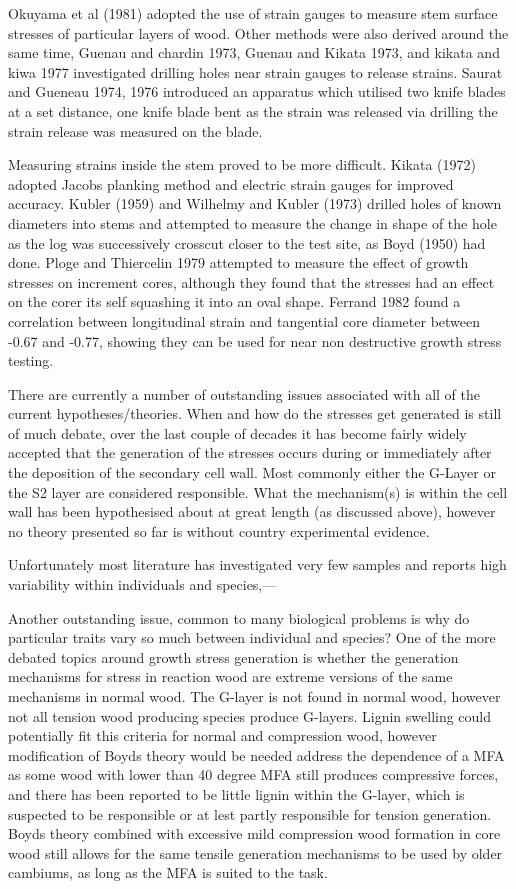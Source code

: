 \documentclass{article}
\begin{document}
Okuyama et al (1981) adopted the use of strain gauges to measure stem surface
stresses of particular layers of wood. Other methods were also derived around
the same time, Guenau and chardin 1973, Guenau and Kikata 1973, and kikata and
kiwa 1977 investigated drilling holes near strain gauges to release strains.
Saurat and Gueneau 1974, 1976 introduced an apparatus which utilised two knife
blades at a set distance, one knife blade bent as the strain was released via
drilling the strain release was measured on the blade.

Measuring strains inside the stem proved to be more difficult. Kikata (1972)
adopted Jacobs planking method and electric strain gauges for improved accuracy.
Kubler (1959) and Wilhelmy and Kubler (1973) drilled holes of known diameters into stems and
attempted to measure the change in shape of the hole as the log was successively
crosscut closer to the test site, as Boyd (1950) had done. Ploge and Thiercelin
1979 attempted to measure the effect of growth stresses on increment cores,
although they found that the stresses had an effect on the corer its self
squashing it into an oval shape. Ferrand 1982 found a correlation between
longitudinal strain and tangential core diameter between -0.67 and -0.77, showing
they can be used for near non destructive growth stress testing.

There are currently a number of outstanding issues associated with all
of the current hypotheses/theories. When and how do the stresses get
generated is still of much debate, over the last couple of decades it has become
fairly widely accepted that the generation of the stresses occurs during or
immediately after the deposition of the secondary cell wall. Most commonly either
the G-Layer or the S2 layer are considered responsible. What the mechanism(s)
is within the cell wall has been hypothesised about at great length (as
discussed above), however no theory presented so far is without country
experimental evidence.

Unfortunately most literature has investigated very few samples and reports high
variability within individuals and species,---

Another outstanding issue, common to many biological problems is why do
particular traits vary so much between individual and species? One of the
more debated topics around growth stress generation is whether the generation
mechanisms for stress in reaction wood are extreme versions of the same
mechanisms in normal wood. The G-layer is not found in normal wood, however not
all tension wood producing species produce G-layers. Lignin swelling could
potentially fit this criteria for normal and compression wood, however
modification of Boyds theory would be needed address the dependence of a MFA
as some wood with lower than 40 degree MFA still produces compressive forces,
and there has been reported to be little lignin within the G-layer, which is
suspected to be responsible or at lest partly responsible for tension
generation. Boyds theory combined with excessive mild compression wood
formation in core wood still allows for the same tensile generation mechanisms
to be used by older cambiums, as long as the MFA is suited to the task.
\end{document}
